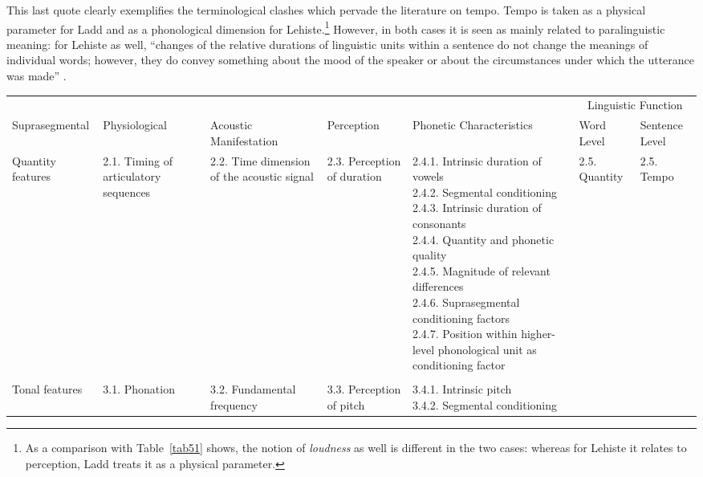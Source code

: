 This last quote clearly exemplifies the terminological clashes which pervade the literature on tempo. Tempo is taken as a physical parameter for Ladd and as a phonological dimension for Lehiste.\footnote{As a comparison with Table~\ref{tab51} shows, the notion of \textit{loudness} as well is different in the two cases: whereas for Lehiste it relates to perception, Ladd treats it as a physical parameter.} However, in both cases it is seen as mainly related to paralinguistic meaning: for Lehiste as well, ``changes of the relative durations of linguistic units within a sentence do not change the meanings of individual words; however, they do convey something about the mood of the speaker or about the circumstances under which the utterance was made'' \cite[§2.5.3]{lehiste1970suprasegmentals}. 

\begin{landscape}
\begin{table}[p]
\mytoprule
\centering
\scriptsize
\sloppy
\begin{tabular}{lp{1.8cm}p{3cm}p{1.7cm}llp{2cm}}
&  &  &  &  &  \multicolumn{2}{c}{Linguistic Function}\\
Suprasegmental &  Physiological & Acoustic  \mbox{Manifestation} &  Perception &  Phonetic Characteristics &  Word Level &  Sentence Level \\
\midrule
{Quantity features} & {2.1. Timing of articulatory sequences} & {2.2. Time dimension of the acoustic signal} & {2.3. Perception of duration} & \parbox[t]{3cm}{2.4.1. Intrinsic duration of vowels\\
									      2.4.2. Segmental conditioning           \\
									      2.4.3. Intrinsic duration of consonants \\
									      2.4.4. Quantity and phonetic quality \\
									      2.4.5. Magnitude of relevant differences\\
									      2.4.6. Suprasegmental conditioning factors\\ 
									      2.4.7. Position within higher-level phonological unit as conditioning factor
									      }& {2.5. Quantity} & {2.5. Tempo} \\
 & & \\
{Tonal features} & {3.1. Phonation} & {3.2. Fundamental frequency} & {3.3. Perception of pitch} & \parbox[t]{3cm}{3.4.1. Intrinsic pitch \\
														    3.4.2. Segmental conditioning  \\
}
\end{tabular}
\end{table}
\end{landscape}
